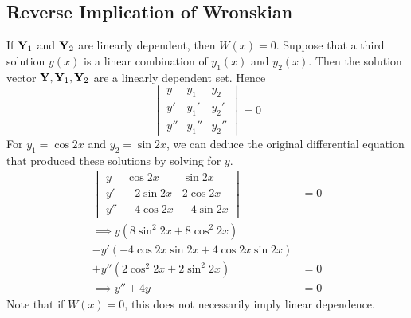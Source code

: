 \subsection{Reverse Implication of Wronskian}
If \(\vb Y_1\) and \(\vb Y_2\) are linearly dependent, then \(W(x) = 0\).
Suppose that a third solution \(y(x)\) is a linear combination of \(y_1(x)\) and \(y_2(x)\).
Then the solution vector \(\vb Y, \vb Y_1, \vb Y_2\) are a linearly dependent set.
Hence
\[
	\begin{vmatrix}
		y   & y_1   & y_2   \\
		y'  & y_1'  & y_2'  \\
		y'' & y_1'' & y_2''
	\end{vmatrix}
	= 0
\]
For \(y_1 = \cos 2x\) and \(y_2 = \sin 2x\), we can deduce the original differential equation that produced these solutions by solving for \(y\).
\begin{align*}
	\begin{vmatrix}
		y   & \cos 2x   & \sin 2x    \\
		y'  & -2\sin 2x & 2 \cos 2x  \\
		y'' & -4\cos 2x & -4 \sin 2x
	\end{vmatrix}          & = 0 \\
	\implies y(8\sin^2 2x + 8\cos^2 2x) &     \\ - y'(-4 \cos 2x \sin 2x + 4 \cos 2x \sin 2x) &\\ + y''(2\cos^2 2x + 2\sin^2 2x) &= 0 \\
	\implies y'' + 4y                   & = 0
\end{align*}
Note that if \(W(x) = 0\), this does not necessarily imply linear dependence.
